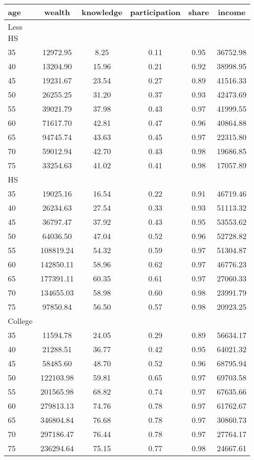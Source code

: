  \begin{tabular}{lccccc}
 \hline \hline
  age & wealth & knowledge & participation & share & income \\
 \hline
 Less HS & & & & & \\
 \hline
35 &  12972.95 &      8.25 &      0.11 &      0.95 &  36752.98 \\ 
40 &  13204.90 &     15.96 &      0.21 &      0.92 &  38998.95 \\ 
45 &  19231.67 &     23.54 &      0.27 &      0.89 &  41516.33 \\ 
50 &  26255.25 &     31.20 &      0.37 &      0.93 &  42473.69 \\ 
55 &  39021.79 &     37.98 &      0.43 &      0.97 &  41999.55 \\ 
60 &  71617.70 &     42.81 &      0.47 &      0.96 &  40864.88 \\ 
65 &  94745.74 &     43.63 &      0.45 &      0.97 &  22315.80 \\ 
70 &  59012.94 &     42.70 &      0.43 &      0.98 &  19686.85 \\ 
75 &  33254.63 &     41.02 &      0.41 &      0.98 &  17057.89 \\ 
 \hline
 HS & & & & & \\
 \hline
35 &  19025.16 &     16.54 &      0.22 &      0.91 &  46719.46 \\ 
40 &  26234.63 &     27.54 &      0.33 &      0.93 &  51113.32 \\ 
45 &  36797.47 &     37.92 &      0.43 &      0.95 &  53553.62 \\ 
50 &  64036.50 &     47.04 &      0.52 &      0.96 &  52728.82 \\ 
55 & 108819.24 &     54.32 &      0.59 &      0.97 &  51304.87 \\ 
60 & 142850.11 &     58.96 &      0.62 &      0.97 &  46776.23 \\ 
65 & 177391.11 &     60.35 &      0.61 &      0.97 &  27060.33 \\ 
70 & 134655.03 &     58.98 &      0.60 &      0.98 &  23991.79 \\ 
75 &  97850.84 &     56.50 &      0.57 &      0.98 &  20923.25 \\ 
 \hline
 College & & & & & \\
 \hline
35 &  11594.78 &     24.05 &      0.29 &      0.89 &  56634.17 \\ 
40 &  21288.51 &     36.77 &      0.42 &      0.95 &  64021.32 \\ 
45 &  58485.60 &     48.70 &      0.52 &      0.96 &  68795.94 \\ 
50 & 122103.98 &     59.81 &      0.65 &      0.97 &  69703.58 \\ 
55 & 201565.98 &     68.82 &      0.74 &      0.97 &  67635.66 \\ 
60 & 279813.13 &     74.76 &      0.78 &      0.97 &  61762.67 \\ 
65 & 346804.84 &     76.68 &      0.78 &      0.97 &  30860.73 \\ 
70 & 297186.47 &     76.44 &      0.78 &      0.97 &  27764.17 \\ 
75 & 236294.64 &     75.15 &      0.77 &      0.98 &  24667.61 \\ 
 \hline \hline
 \end{tabular}

